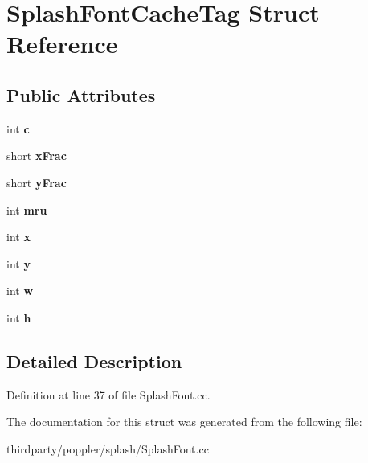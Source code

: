 \hypertarget{struct_splash_font_cache_tag}{}\section{Splash\+Font\+Cache\+Tag Struct Reference}
\label{struct_splash_font_cache_tag}
\subsection*{Public Attributes}
\begin{DoxyCompactItemize}
\item 
\mbox{\label{struct_splash_font_cache_tag_aecf5b9de55e079cc1eebc3dc44dc188f}} 
int {\bfseries c}
\item 
\mbox{\label{struct_splash_font_cache_tag_a29eeb496bb54b65d5fdfae381c73d40c}} 
short {\bfseries x\+Frac}
\item 
\mbox{\label{struct_splash_font_cache_tag_a8acbe65dd535be08a483e6c6766ead20}} 
short {\bfseries y\+Frac}
\item 
\mbox{\label{struct_splash_font_cache_tag_a94c4311a292a4cb137242eae0212e32d}} 
int {\bfseries mru}
\item 
\mbox{\label{struct_splash_font_cache_tag_aa131255bd8ce81f85d7ceb334f18f2aa}} 
int {\bfseries x}
\item 
\mbox{\label{struct_splash_font_cache_tag_a175325618631f715a5fffdb7600454db}} 
int {\bfseries y}
\item 
\mbox{\label{struct_splash_font_cache_tag_a9d38c9fc6f083dc88b10a250d45cfade}} 
int {\bfseries w}
\item 
\mbox{\label{struct_splash_font_cache_tag_a1bb1cb20dc15c77a21b16ff4f7b91a2c}} 
int {\bfseries h}
\end{DoxyCompactItemize}


\subsection{Detailed Description}


Definition at line 37 of file Splash\+Font.\+cc.



The documentation for this struct was generated from the following file\+:\begin{DoxyCompactItemize}
\item 
thirdparty/poppler/splash/Splash\+Font.\+cc\end{DoxyCompactItemize}

